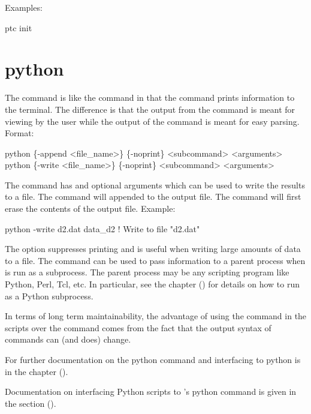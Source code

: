 Examples:
\begin{example}
  ptc init
\end{example}

\section{python}
\label{s:python}

The  command is like the  command in that the  command prints
information to the terminal. The difference is that the output from the  command is meant
for viewing by the user while the output of the  command is meant for easy
parsing. Format:
\begin{example}
  python \{-append <file_name>\} \{-noprint\} <subcommand> <arguments>
  python \{-write <file_name>\} \{-noprint\} <subcommand> <arguments>
\end{example}

The  command has  and  optional arguments which can be used to
write the results to a file. The  command will appended to the output file. The
 command will first erase the contents of the output file. Example:
\begin{example}
  python -write d2.dat data_d2    ! Write to file "d2.dat"
\end{example}

The  option suppresses printing and is useful when writing large amounts of data to a
file.  The  command can be used to pass information to a parent process when \tao is run
as a subprocess.  The parent process may be any scripting program like Python, Perl, Tcl, etc.  In
particular, see the  chapter () for details on how to run
\tao as a Python subprocess.

In terms of long term maintainability, the advantage of using the  command in the scripts
over the  command comes from the fact that the output syntax of  commands can (and
does) change.

For further documentation on the python command and interfacing to python is in the  chapter ().

Documentation on interfacing Python scripts to \tao's python command is given in the  section ().

